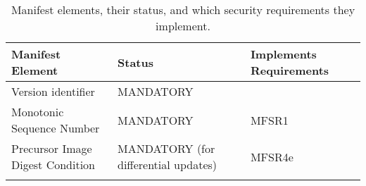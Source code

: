 \documentclass[0-thesis.tex]{subfiles}
\begin{document}
\begin{longtable}[]{@{}lll@{}}
    \caption{Manifest elements, their status, and which security requirements they implement.}
    \label{tab:elements-to-requirements}\\
    \toprule
    \begin{minipage}[b]{0.32\columnwidth}\raggedright\strut
    Manifest Element\strut
    \end{minipage} & \begin{minipage}[b]{0.36\columnwidth}\raggedright\strut
    Status\strut
    \end{minipage} & \begin{minipage}[b]{0.23\columnwidth}\raggedright\strut
    Implements Requirements\strut
    \end{minipage}\tabularnewline
    \midrule
    \endhead
    \begin{minipage}[t]{0.32\columnwidth}\raggedright\strut
    Version identifier\strut
    \end{minipage} & \begin{minipage}[t]{0.36\columnwidth}\raggedright\strut
    MANDATORY\strut
    \end{minipage} & \begin{minipage}[t]{0.23\columnwidth}\raggedright\strut
    \strut
    \end{minipage}\tabularnewline
    \begin{minipage}[t]{0.32\columnwidth}\raggedright\strut
    Monotonic Sequence Number\strut
    \end{minipage} & \begin{minipage}[t]{0.36\columnwidth}\raggedright\strut
    MANDATORY\strut
    \end{minipage} & \begin{minipage}[t]{0.23\columnwidth}\raggedright\strut
    MFSR1\strut
    \end{minipage}\tabularnewline
    \begin{minipage}[t]{0.32\columnwidth}\raggedright\strut
    Precursor Image Digest Condition\strut
    \end{minipage} & \begin{minipage}[t]{0.36\columnwidth}\raggedright\strut
    MANDATORY (for differential updates)\strut
    \end{minipage} & \begin{minipage}[t]{0.23\columnwidth}\raggedright\strut
    MFSR4e\strut
    \end{minipage}\tabularnewline
    \begin{minipage}[t]{0.32\columnwidth}\raggedright\strut

\end{minipage}
\end{longtable}
\end{document}
